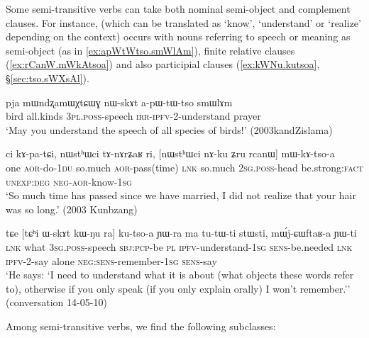 Some semi-transitive verbs can take both nominal semi-object and complement clauses. For instance,  (which can be translated as `know', `understand' or `realize' depending on the context) occurs with nouns referring to speech or meaning as semi-object (as in \ref{ex:apWtWtso.smWlAm}), finite relative clauses (\ref{ex:rCanW.mWkAtsoa}) and also participial clauses (\ref{ex:kWNu.kutsoa}, §\ref{sec:tso.sWXsAl}).

\begin{exe}
\ex \label{ex:apWtWtso.smWlAm}
\gll pja mɯndʐamɯχtɕɯɣ nɯ-skɤt a-pɯ-tɯ-tso smɯlɤm\\
bird all.kinds \textsc{3pl}.\textsc{poss}-speech \textsc{irr}-\textsc{ipfv}-2-understand prayer\\
\glt `May you understand the speech of all species of birds!' (2003kandZislama)
\end{exe}

\begin{exe}
\ex   \label{ex:rCanW.mWkAtsoa}
 \gll ci kɤ-pa-tɕi, nɯstʰɯci tɤ-nɤrʑaʁ ri, [nɯstʰɯci nɤ-ku ʑru rcanɯ] mɯ-kɤ-tso-a \\
 one \textsc{aor}-do-\textsc{1du} so.much \textsc{aor}-pass(time) \textsc{lnk} so.much \textsc{2sg}.\textsc{poss}-head be.strong:\textsc{fact} \textsc{unexp}:\textsc{deg} \textsc{neg}-\textsc{aor}-know-\textsc{1sg} \\
\glt `So much time has passed since we have married, I did not realize that your hair was so long.' (2003 Kunbzang)
\end{exe}

\begin{exe}
\ex   \label{ex:kWNu.kutsoa}
 \gll  tɕe [tɕʰi ɯ-skɤt kɯ-ŋu ra] ku-tso-a ɲɯ-ra ma tu-tɯ-ti stɯsti, mɯ́j-ɕɯftaʁ-a ɲɯ-ti \\
\textsc{lnk} what \textsc{3sg}.\textsc{poss}-speech \textsc{sbj}:\textsc{pcp}-be \textsc{pl} \textsc{ipfv}-understand-\textsc{1sg} \textsc{sens}-be.needed \textsc{lnk} \textsc{ipfv}-2-say alone \textsc{neg}:\textsc{sens}-remember-\textsc{1sg} \textsc{sens}-say \\
 \glt `He says: `I need to understand what it is about (what objects these words refer to), otherwise if you only speak (if you only explain orally) I won't remember.'' (conversation 14-05-10)
\end{exe}
Among semi-transitive verbs, we find the following subclasses:

